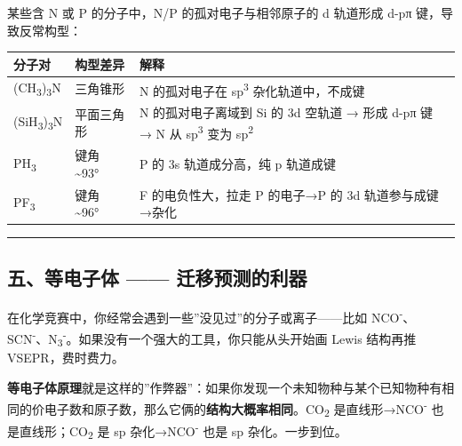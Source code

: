 \documentclass[a4paper,11pt]{ctexart}
\newcounter{none}
\begin{document}
某些含 N 或 P 的分子中，N/P 的孤对电子与相邻原子的 d 轨道形成 d-pπ 键，导致反常构型：

{\def\LTcaptype{none} %
\begin{longtable}[]{@{}
  >{\raggedright\arraybackslash}p{}
  >{\raggedright\arraybackslash}p{}
  >{\raggedright\arraybackslash}p{}@{}}
\toprule\noalign{}
\begin{minipage}[b]{\linewidth}\raggedright
分子对
\end{minipage} & \begin{minipage}[b]{\linewidth}\raggedright
构型差异
\end{minipage} & \begin{minipage}[b]{\linewidth}\raggedright
解释
\end{minipage} \\
\midrule\noalign{}
\endhead
\bottomrule\noalign{}
\endlastfoot
(CH\textsubscript{3})\textsubscript{3}N & 三角锥形 & N 的孤对电子在 sp\textsuperscript{3} 杂化轨道中，不成键 \\
(SiH\textsubscript{3})\textsubscript{3}N & 平面三角形 & N 的孤对电子离域到 Si 的 3d 空轨道 → 形成 d-pπ 键 → N 从 sp\textsuperscript{3} 变为 sp\textsuperscript{2} \\
PH\textsubscript{3} & 键角 \textasciitilde93° & P 的 3s 轨道成分高，纯 p 轨道成键 \\
PF\textsubscript{3} & 键角 \textasciitilde96° & F 的电负性大，拉走 P 的电子→P 的 3d 轨道参与成键→杂化 \\
\end{longtable}
}

\begin{center}\rule{0.5\linewidth}{0.5pt}\end{center}

\subsection{五、等电子体 ------ 迁移预测的利器}\label{ux4e94ux7b49ux7535ux5b50ux4f53-ux8fc1ux79fbux9884ux6d4bux7684ux5229ux5668}

在化学竞赛中，你经常会遇到一些''没见过''的分子或离子------比如 NCO\textsuperscript{-}、SCN\textsuperscript{-}、N\textsubscript{3}\textsuperscript{-}。如果没有一个强大的工具，你只能从头开始画 Lewis 结构再推 VSEPR，费时费力。

\textbf{等电子体原理}就是这样的''作弊器''：如果你发现一个未知物种与某个已知物种有相同的价电子数和原子数，那么它俩的\textbf{结构大概率相同}。CO\textsubscript{2} 是直线形→NCO\textsuperscript{-} 也是直线形；CO\textsubscript{2} 是 sp 杂化→NCO\textsuperscript{-} 也是 sp 杂化。一步到位。
\end{document}

